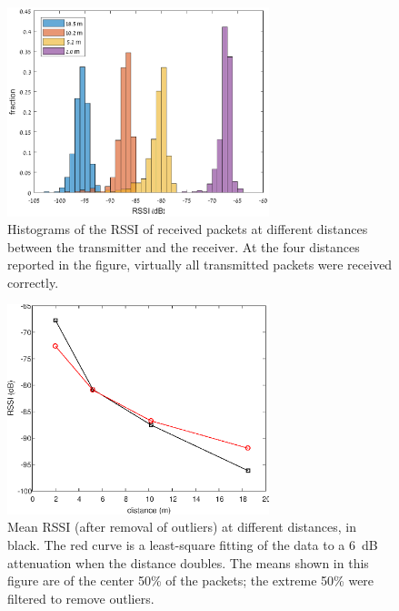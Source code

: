 \begin{figure}[h]
    \centering
    \includegraphics[width=3in]{experiments/rssiHistograms.eps}
    \caption{Histograms of the RSSI of received packets at different distances between 
    the transmitter and the receiver. At the four distances reported in the figure, 
    virtually all transmitted packets were received correctly.}
    \label{fig:rssiHistograms}
\end{figure}

\begin{figure}[h]
    \centering
    \includegraphics[width=3in]{experiments/rssiDistance.eps}
    \caption{Mean RSSI (after removal of outliers) at different distances, in black. 
    The red curve is a least-square
    fitting of the data to a 6~dB attenuation when the distance doubles.
    The means shown in this figure are of the center 50\% of the packets; 
    the extreme 50\% were filtered to remove outliers.}
    \label{fig:rssiDistance}
\end{figure}

